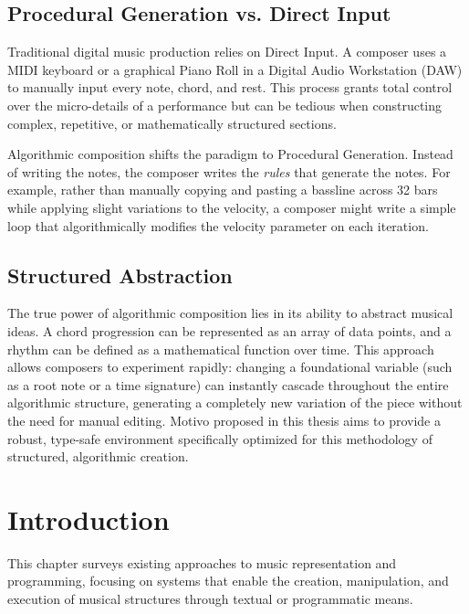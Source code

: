 \subsection{Procedural Generation vs. Direct Input}\label{detail-subsec:procedural-generation-vs.-direct-input}

Traditional digital music production relies on Direct Input.
A composer uses a MIDI keyboard or a graphical Piano Roll in a Digital Audio Workstation (DAW) to manually input every
note, chord, and rest.
This process grants total control over the micro-details of a performance but can be tedious when constructing complex,
repetitive, or mathematically structured sections.

Algorithmic composition shifts the paradigm to Procedural Generation.
Instead of writing the notes, the composer writes the \textit{rules} that generate the notes.
For example, rather than manually copying and pasting a bassline across 32 bars while applying slight variations to the
velocity, a composer might write a simple loop that algorithmically modifies the velocity parameter on each iteration.

\subsection{Structured Abstraction}\label{detail-subsec:structured-abstraction}

The true power of algorithmic composition lies in its ability to abstract musical ideas.
A chord progression can be represented as an array of data points, and a rhythm can be defined as a mathematical
function over time.
This approach allows composers to experiment rapidly: changing a foundational variable (such as a root note or a time
signature) can instantly cascade throughout the entire algorithmic structure, generating a completely new variation of
the piece without the need for manual editing.
Motivo proposed in this thesis aims to provide a robust, type-safe environment specifically optimized for this
methodology of structured, algorithmic creation.


\section{Introduction}\label{detail-sec:introduction}

This chapter surveys existing approaches to music representation and programming, focusing on systems that enable the
creation, manipulation, and execution of musical structures through textual or programmatic means.

